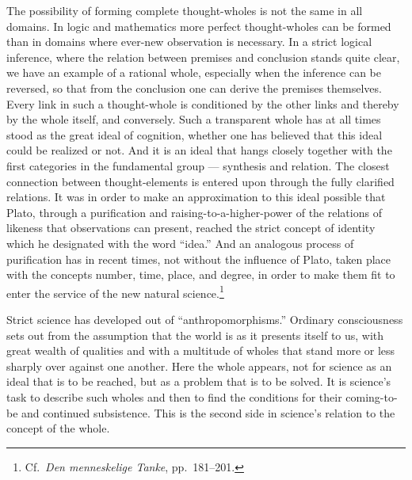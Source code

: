 \documentclass[12pt]{book}
\newcommand{\opage}[1]{\marginnote{\footnotesize\textit{[#1]}}}
\begin{document}
The possibility of forming complete thought-wholes is not the same in all domains. In logic and
mathematics more perfect thought-wholes can be formed than in domains where ever-new observation
is necessary. In a strict logical inference, where the relation between premises and conclusion
stands quite clear, we have an example of a rational whole, especially when the inference can be
reversed, so that from the conclusion one can derive the premises themselves. Every link in such
a thought-whole is conditioned by the other links and thereby by the whole itself, and
conversely. \opage{10}Such a transparent whole has at all times stood as the great ideal of cognition,
whether one has believed that this ideal could be realized or not. And it is an ideal that hangs
closely together with the first categories in the fundamental group --- synthesis and relation.
The closest connection between thought-elements is entered upon through the fully clarified
relations. It was in order to make an approximation to this ideal possible that Plato, through a
purification and raising-to-a-higher-power of the relations of likeness that observations can
present, reached the strict concept of identity which he designated with the word ``idea.'' And
an analogous process of purification has in recent times, not without the influence of Plato,
taken place with the concepts number, time, place, and degree, in order to make them fit to enter
the service of the new natural science.\footnote{Cf.\ \textit{Den menneskelige Tanke}, pp.\
181--201.}

Strict science has developed out of ``anthropomorphisms.'' Ordinary consciousness sets out from
the assumption that the world is as it presents itself to us, with great wealth of qualities and
with a multitude of wholes that stand more or less sharply over against one another. Here the
whole appears, not for science as an ideal that is to be reached, but as a problem that is to be
solved. It is science's task to describe such wholes and then to find the conditions for their
coming-to-be and continued subsistence. This is the second side in science's relation to the
concept of the whole.
\end{document}
